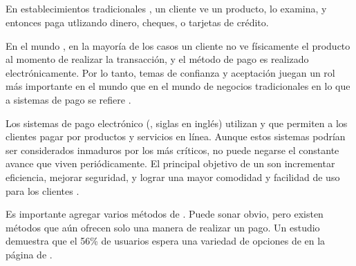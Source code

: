 \subsection{\paymentsCOM}\label{cap:solucionImplementada:section:dashboard:subsection:payment}
	En establecimientos tradicionales \brickandmortar, un cliente ve un producto, lo examina, y entonces paga utlizando dinero, cheques, o tarjetas de crédito.

	En el mundo \ecommerceCOM, en la mayoría de los casos un cliente no ve físicamente el producto al momento de realizar la transacción, y el método de pago es realizado electrónicamente. Por lo tanto, temas de confianza y aceptación juegan un rol más importante en el mundo \ecommerceCOM que en el mundo de negocios tradicionales en lo que a sistemas de pago se refiere \cite{bidgoli2002electronic}.

	Los sistemas de pago electrónico (\epsSiglasCOM, siglas en inglés) utilizan \hardwarePC y \softwarePC que permiten a los clientes pagar por productos y servicios en línea. Aunque estos sistemas podrían ser considerados inmaduros por los más críticos, no puede negarse el constante avance que viven periódicamente. El principal objetivo de un \epsSiglasCOM son incrementar eficiencia, mejorar seguridad, y lograr una mayor comodidad y facilidad de uso para los clientes \cite{bidgoli2002electronic}.

	Es importante agregar varios métodos de \paymentsCOM. Puede sonar obvio, pero existen métodos que aún ofrecen solo una manera de realizar un pago. Un estudio demuestra que el 56\% de usuarios espera una variedad de opciones de \paymentsCOM en la página de \checkoutCOM \cite{online_kissmetrics_easy_payment_process}.

